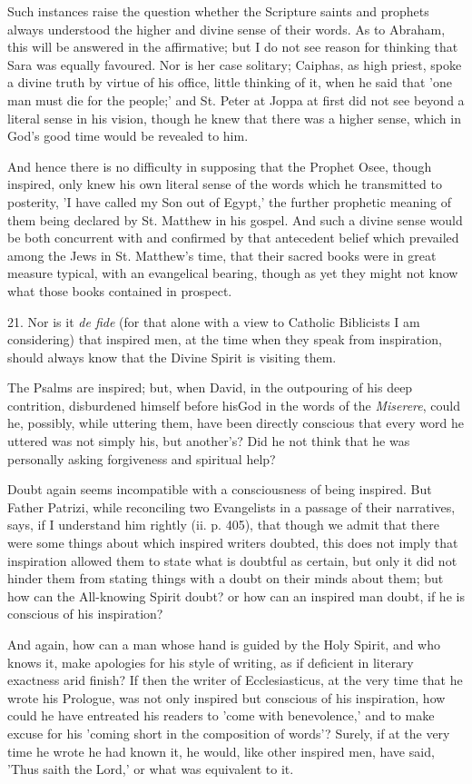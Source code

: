 Such instances raise the question whether the
Scripture saints and prophets always understood the higher and divine
sense of their words. As to Abraham, this will be answered in the
affirmative; but I do not see reason for thinking that Sara was
equally favoured. Nor is her case solitary; Caiphas, as high priest,
spoke a divine truth by virtue of his office, little thinking of it,
when he said that 'one man must die for the people;' and St. Peter at
Joppa at first did not see beyond a literal sense in his vision,
though he knew that there was a higher sense, which in God's good time
would be revealed to him.

And hence there is no difficulty in supposing
that the Prophet Osee, though inspired, only knew his own literal
sense of the words which he transmitted to posterity, 'I have called
my Son out of Egypt,' the further prophetic meaning of them being
declared by St. Matthew in his gospel. And such a divine sense would
be both concurrent with and confirmed by that antecedent belief which
prevailed among the Jews in St. Matthew's time, that their sacred
books were in great measure typical, with an evangelical bearing,
though as yet they might not know what those books contained in
prospect.

21. Nor is it \emph{de fide} (for that alone with
a view to Catholic Biblicists I am considering) that inspired men, at
the time when they speak from inspiration, should always know that the
Divine Spirit is visiting them.

The Psalms are inspired; but, when David, in the
outpouring of his deep contrition, disburdened himself before hisGod
in the words of the \emph{Miserere}, could he, possibly, while
uttering them, have been directly conscious that every word he uttered
was not simply his, but another's? Did he not think that he was
personally asking forgiveness and spiritual help?

Doubt again seems incompatible with a
consciousness of being inspired. But Father Patrizi, while reconciling
two Evangelists in a passage of their narratives, says, if I
understand him rightly (ii. p. 405), that though we admit that there
were some things about which inspired writers doubted, this does not
imply that inspiration allowed them to state what is doubtful as
certain, but only it did not hinder them from stating things with a
doubt on their minds about them; but how can the All-knowing Spirit
doubt? or how can an inspired man doubt, if he is conscious of his
inspiration?

And again, how can a man whose hand is guided by
the Holy Spirit, and who knows it, make apologies for his style of
writing, as if deficient in literary exactness arid finish? If then
the writer of Ecclesiasticus, at the very time that he wrote his
Prologue, was not only inspired but conscious of his inspiration, how
could he have entreated his readers to 'come with benevolence,' and to
make excuse for his 'coming short in the composition of words'?
Surely, if at the very time he wrote he had known it, he would, like
other inspired men, have said, 'Thus saith the Lord,' or what was
equivalent to it.

